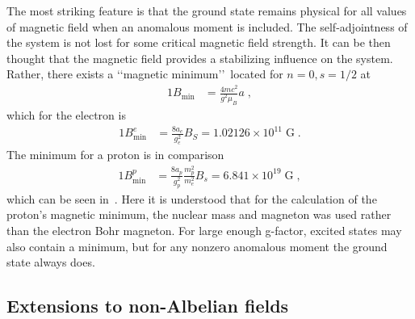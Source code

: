 The most striking feature is that the ground state remains physical for all values of magnetic field when an anomalous moment is included. The self-adjointness of the system is not lost for some critical magnetic field strength. It can be then thought that the magnetic field provides a stabilizing influence on the system. Rather, there exists a \lq\lq magnetic minimum\rq\rq\ located for $n=0, s=1/2$ at
\begin{alignat}{1}
\label{IKGP06} B_{\mathrm{min}}&=\frac{4mc^{2}}{g^{2}\mu_{B}}a\;,
\end{alignat}
which for the electron is
\begin{alignat}{1}
B_{\mathrm{min}}^{e}&=\frac{8a_e}{g_e^2}{B}_S
=1.02126\times10^{11}\;\mathrm{G}\;.
\end{alignat}
The minimum for a proton is in comparison
\begin{alignat}{1}
B_{\mathrm{min}}^{p}&=\frac{8a_p}{g_p^2} \frac{m_p^2}{m_e^2}{B}_s
=6.841\times10^{19}\;\mathrm{G}\;,
\end{alignat}
which can be seen in~. Here it is understood that for the calculation of the proton's magnetic minimum, the nuclear mass and magneton was used rather than the electron Bohr magneton. For large enough g-factor, excited states may also contain a minimum, but for any nonzero anomalous moment the ground state always does.

\subsection{Extensions to non-Albelian fields}
\label{sec:quarks}

